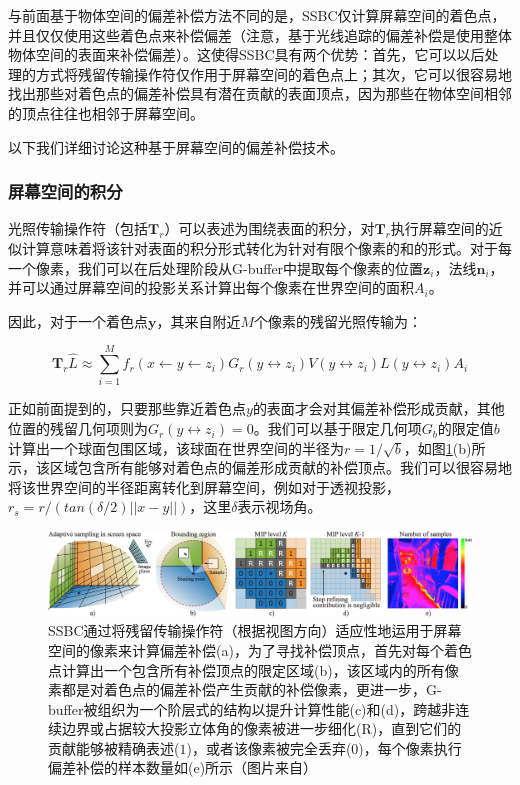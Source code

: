 与前面基于物体空间的偏差补偿方法不同的是，SSBC仅计算屏幕空间的着色点，并且仅仅使用这些着色点来补偿偏差（注意，基于光线追踪的偏差补偿是使用整体物体空间的表面来补偿偏差）。这使得SSBC具有两个优势：首先，它可以以后处理的方式将残留传输操作符仅作用于屏幕空间的着色点上；其次，它可以很容易地找出那些对着色点的偏差补偿具有潜在贡献的表面顶点，因为那些在物体空间相邻的顶点往往也相邻于屏幕空间。

以下我们详细讨论这种基于屏幕空间的偏差补偿技术。




\subsubsection{屏幕空间的积分}
光照传输操作符（包括$\mathbf{T}_r$）可以表述为围绕表面的积分，对$\mathbf{T}_r$执行屏幕空间的近似计算意味着将该针对表面的积分形式转化为针对有限个像素的和的形式。对于每一个像素，我们可以在后处理阶段从G-buffer中提取每个像素的位置$\mathbf{z}_i$，法线$\mathbf{n}_i$，并可以通过屏幕空间的投影关系计算出每个像素在世界空间的面积$A_i$。

因此，对于一个着色点$\mathbf{y}$，其来自附近$M$个像素的残留光照传输为：

\begin{equation}\label{e:ir-operator}
	\mathbf{T}_r\hat{L}\approx\sum^{M}_{i=1}f_r(x\leftarrow y\leftarrow z_i)G_r(y\leftrightarrow z_i)V(y\leftrightarrow z_i)L(y\leftrightarrow z_i)A_i
\end{equation}

\noindent 正如前面提到的，只要那些靠近着色点$y$的表面才会对其偏差补偿形成贡献，其他位置的残留几何项则为$G_r(y\leftrightarrow z_i)=0$。我们可以基于限定几何项$G_b$的限定值$b$计算出一个球面包围区域，该球面在世界空间的半径为$r=1/\sqrt{b}$，如图\ref{f:ir-ssbc}(b)所示，该区域包含所有能够对着色点的偏差形成贡献的补偿顶点。我们可以很容易地将该世界空间的半径距离转化到屏幕空间，例如对于透视投影，$r_s=r/(tan(\delta /2)||x-y||)$，这里$\delta$表示视场角。

\begin{figure}
\begin{fullwidth}	
	\includegraphics[width=1.0\thewidth]{figures/ir/ir-6-1}
	\caption{SSBC通过将残留传输操作符（根据视图方向）适应性地运用于屏幕空间的像素来计算偏差补偿(a)，为了寻找补偿顶点，首先对每个着色点计算出一个包含所有补偿顶点的限定区域(b)，该区域内的所有像素都是对着色点的偏差补偿产生贡献的补偿像素，更进一步，G-buffer被组织为一个阶层式的结构以提升计算性能(c)和(d)，跨越非连续边界或占据较大投影立体角的像素被进一步细化(R)，直到它们的贡献能够被精确表述($1$)，或者该像素被完全丢弃($0$)，每个像素执行偏差补偿的样本数量如(e)所示（图片来自\cite{a:Screen-SpaceBiasCompensationfor}）}
	\label{f:ir-ssbc}
\end{fullwidth}
\end{figure}

